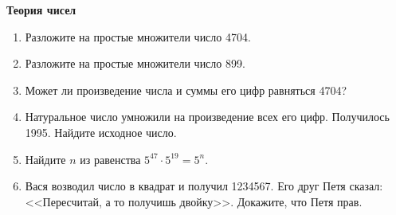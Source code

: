 \documentclass{article}
\begin{document}
\large
	
\begin{center}
	\textbf{Теория чисел}
\end{center}


\begin{enumerate}[label*=\protect\fbox{\arabic{enumi}}]

\item Разложите на простые множители число 4704.

\item Разложите на простые множители число 899.

\item Может ли произведение числа и суммы его цифр равняться 4704?

\item Натуральное число умножили на произведение всех его цифр. Получилось 1995. Найдите исходное
число.

\item Найдите $n$ из равенства $5^{47} \cdot 5^{19} = 5^n$.

\item Вася возводил число в квадрат и получил 1234567. Его друг Петя сказал: <<Пересчитай, а то получишь двойку>>. Докажите, что Петя прав.


\end{enumerate}
\end{document}
